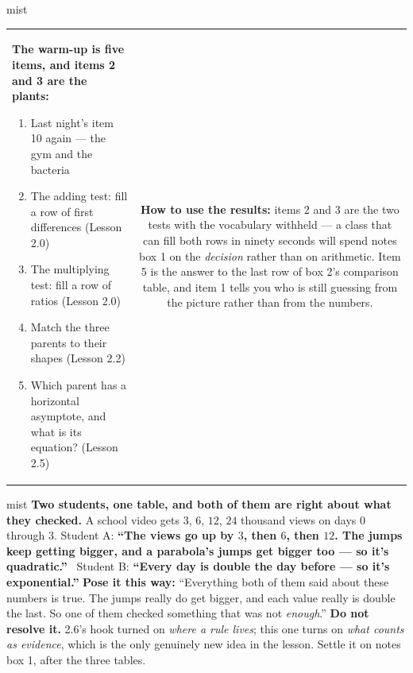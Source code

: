 \documentclass[10pt]{article}
\begin{document}
\begin{fixedskillbox}{mist}
\begin{tabularx}{\linewidth}{@{}X c@{}}
\begin{minipage}[t]{0.55\linewidth}\vspace{0pt}
\textbf{The warm-up is five items, and items 2 and 3 are the plants:}
\begin{enumerate}[leftmargin=1.4em, itemsep=1pt, topsep=2pt]
  \item Last night's item 10 again --- the gym and the bacteria
  \item The adding test: fill a row of first differences (Lesson 2.0)
  \item The multiplying test: fill a row of ratios (Lesson 2.0)
  \item Match the three parents to their shapes (Lesson 2.2)
  \item Which parent has a horizontal asymptote, and what is its equation? (Lesson 2.5)
\end{enumerate}
\end{minipage}
&
\begin{minipage}[t]{0.38\linewidth}\vspace{0pt}
\textbf{How to use the results:} items 2 and 3 are the two tests with the vocabulary withheld --- a
class that can fill both rows in ninety seconds will spend notes box 1 on the \emph{decision} rather
than on arithmetic. Item 5 is the answer to the last row of box 2's comparison table, and item 1
tells you who is still guessing from the picture rather than from the numbers.
\end{minipage}
\end{tabularx}
\end{fixedskillbox}

\begin{skillbox}[Hook]{mist}
\textbf{Two students, one table, and both of them are right about what they checked.} A school video
gets $3$, $6$, $12$, $24$ thousand views on days $0$ through $3$. \quad Student A: \textbf{``The
views go up by $3$, then $6$, then $12$. The jumps keep getting bigger, and a parabola's jumps get
bigger too --- so it's quadratic.''} \ Student B: \textbf{``Every day is double the day before --- so
it's exponential.''} \textbf{Pose it this way:} ``Everything both of them said about these numbers is
true. The jumps really do get bigger, and each value really is double the last. So one of them
checked something that was not \emph{enough}.'' \textbf{Do not resolve it.} 2.6's hook turned on
\emph{where a rule lives}; this one turns on \emph{what counts as evidence}, which is the only
genuinely new idea in the lesson. Settle it on notes box 1, after the three tables.
\end{skillbox}
\end{document}
